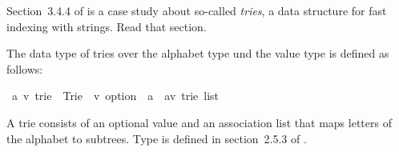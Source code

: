 %
\begin{isabellebody}%
\def\isabellecontext{Trie{\isadigit{1}}}%
\isamarkupfalse%
%
\isamarkuptrue%
%
\begin{isamarkuptext}%
Section~3.4.4 of \cite{isabelle-tutorial} is a case study
about so-called \emph{tries}, a data structure for fast indexing with
strings. Read that section.

The data type of tries over the alphabet type  und the value
type  is defined as follows:%
\end{isamarkuptext}%
\isamarkuptrue%
\ {\isacharparenleft}{\isacharprime}a{\isacharcomma}\ {\isacharprime}v{\isacharparenright}\ trie\ {\isacharequal}\ Trie\ \ {\isachardoublequote}{\isacharprime}v\ option{\isachardoublequote}\ \ {\isachardoublequote}{\isacharparenleft}{\isacharprime}a\ {\isacharasterisk}\ {\isacharparenleft}{\isacharprime}a{\isacharcomma}{\isacharprime}v{\isacharparenright}\ trie{\isacharparenright}\ list{\isachardoublequote}\isamarkupfalse%
%
\begin{isamarkuptext}%
A trie consists of an optional value and an association list
that maps letters of the alphabet to subtrees. Type  is
defined in section~2.5.3 of \cite{isabelle-tutorial}.


\end{isamarkuptext}
\end{isabellebody}
